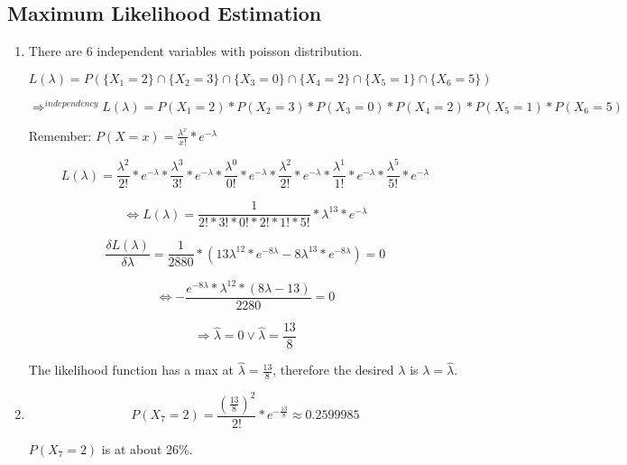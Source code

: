 \documentclass[12pt]{article}
\begin{document}

\subsection{Maximum Likelihood Estimation}

	\begin{enumerate}
	
	\item

	There are 6 independent variables with poisson distribution.
	
	$$L(\lambda)= P(\{X_1=2\} \cap \{X_2=3\} \cap \{X_3=0\} \cap \{X_4=2\} \cap \{X_5=1\} \cap \{X_6=5\})$$
	
	$$\Rightarrow^{independency} L(\lambda)= P(X_1=2) * P(X_2=3) * P(X_3=0) * P(X_4=2) * P(X_5=1) * P(X_6=5)$$
	
	Remember: $P(X=x)= \frac{\lambda^x}{x!}*e^{-\lambda}$
	
	$$L(\lambda)= \frac{\lambda^2}{2!}*e^{-\lambda} * \frac{\lambda^3}{3!}*e^{-\lambda} * \frac{\lambda^0}{0!}*e^{-\lambda} * \frac{\lambda^2}{2!}*e^{-\lambda} * \frac{\lambda^1}{1!}*e^{-\lambda} * \frac{\lambda^5}{5!}*e^{-\lambda} $$
	
	$$ \Leftrightarrow L(\lambda)= \frac{1}{2!*3!*0!*2!*1!*5!} * \lambda^{13} * e^{-\lambda} $$
	
	$$ \frac{\delta L(\lambda)}{\delta \lambda} = \frac{1}{2880}*(13\lambda^{12}*e^{-8\lambda} -8\lambda^{13}*e^{-8\lambda})=0$$
	
	$$ \Leftrightarrow -\frac{e^{-8\lambda}*\lambda^{12}*(8\lambda-13)}{2280} = 0 $$
	
	$$ \Rightarrow \hat{\lambda}=0 \vee \hat{\lambda}=\frac{13}{8} $$
	
	The likelihood function has a max at $\hat{\lambda}=\frac{13}{8}$, therefore the desired $\lambda$ is $\lambda=\hat{\lambda}$.

	\item	
	
	$$ P(X_7=2) = \frac{(\frac{13}{8})^2}{2!} * e^{-\frac{13}{8}} \approx 0.2599985 $$
	
	$ P(X_7=2)$ is at about 26\%.
	
	\end{enumerate}
\end{document}
